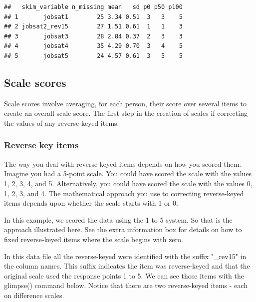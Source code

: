 \documentclass[
]{krantz}
\makeatletter
\newenvironment{Shaded}{\begin{snugshade}}{\end{snugshade}}
\newcommand{\KeywordTok}[1]{\textcolor[rgb]{0.27,0.27,0.27}{\textbf{#1}}}
\newcommand{\NormalTok}[1]{#1}
\newcommand{\OperatorTok}[1]{\textcolor[rgb]{0.43,0.43,0.43}{\textbf{#1}}}
\newcommand{\StringTok}[1]{\textcolor[rgb]{0.5,0.5,0.5}{#1}}
\newenvironment{kframe}{%
\medskip{}
\setlength{\fboxsep}{.8em}
 \def\at@end@of@kframe{}%
 \ifinner\ifhmode%
  \def\at@end@of@kframe{\end{minipage}}%
  \begin{minipage}{\columnwidth}%
 \fi\fi%
 \def\FrameCommand##1{\hskip\@totalleftmargin \hskip-\fboxsep
 \colorbox{shadecolor}{##1}\hskip-\fboxsep
     \hskip-\linewidth \hskip-\@totalleftmargin \hskip\columnwidth}%
 \MakeFramed {\advance\hsize-\width
   \@totalleftmargin\z@ \linewidth\hsize
   \@setminipage}}%
 {\par\unskip\endMakeFramed%
 \at@end@of@kframe}
\renewenvironment{Shaded}{\begin{kframe}}{\end{kframe}}
\makeatother
\begin{document}
\begin{Shaded}
\end{Shaded}

\begin{verbatim}
##   skim_variable n_missing mean   sd p0 p50 p100
## 1       jobsat1        25 3.34 0.51  3   3    5
## 2 jobsat2_rev15        27 1.51 0.61  1   1    3
## 3       jobsat3        28 2.84 0.37  2   3    3
## 4       jobsat4        35 4.29 0.70  3   4    5
## 5       jobsat5        24 4.57 0.61  3   5    5
\end{verbatim}

\hypertarget{scale-scores}{%
\subsection{Scale scores}\label{scale-scores}}

Scale scores involve averaging, for each person, their score over several items to create an overall scale score. The first step in the creation of scales if correcting the values of any reverse-keyed items.

\hypertarget{reverse-key-items}{%
\subsubsection{Reverse key items}\label{reverse-key-items}}

The way you deal with reverse-keyed items depends on how you scored them. Imagine you had a 5-point scale. You could have scored the scale with the values 1, 2, 3, 4, and 5. Alternatively, you could have scored the scale with the values 0, 1, 2, 3, and 4. The mathematical approach you use to correcting reverse-keyed items depends upon whether the scale starts with 1 or 0.

In this example, we scored the data using the 1 to 5 system. So that is the approach illustrated here. See the extra information box for details on how to fixed reverse-keyed items where the scale begins with zero.

In this data file all the reverse-keyed were identified with the suffix "\_rev15" in the column names. This suffix indicates the item was reverse-keyed and that the original scale used the response points 1 to 5. We can see those items with the glimpse() command below. Notice that there are two reverse-keyed items - each on difference scales.
\end{document}
